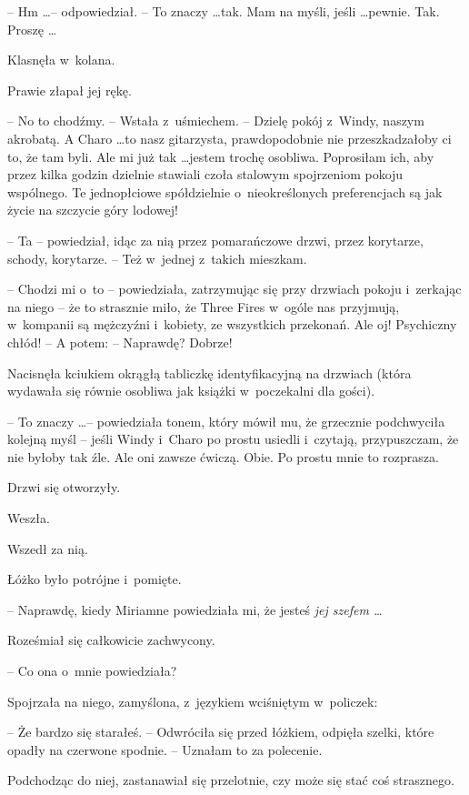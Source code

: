 \documentclass[oneside,polish,11pt,rmheadings]{mwbk}
\begin{document}
-- Hm \ldots  -- odpowiedział. -- To znaczy \ldots  tak. Mam na myśli, jeśli \ldots  pewnie. Tak. Proszę  \ldots  

Klasnęła w~kolana. 

Prawie złapał jej rękę. 

-- No to chodźmy. -- Wstała z~uśmiechem. -- Dzielę pokój z~Windy, naszym akrobatą. A Charo \ldots  to nasz gitarzysta,  prawdopodobnie nie przeszkadzałoby ci to, że tam byli. Ale mi już tak \ldots  jestem trochę osobliwa. Poprosiłam ich, aby przez kilka godzin dzielnie stawiali czoła stalowym spojrzeniom pokoju wspólnego. Te jednopłciowe spółdzielnie o~nieokreślonych preferencjach są jak życie na szczycie góry lodowej! 

-- Ta -- powiedział, idąc za nią przez pomarańczowe drzwi, przez korytarze, schody, korytarze. -- Też w~jednej z~takich mieszkam. 

-- Chodzi mi o~to -- powiedziała, zatrzymując się przy drzwiach pokoju i~zerkając na niego -- że to strasznie miło, że Three Fires w~ogóle nas przyjmują, w~kompanii są mężczyźni i~kobiety, ze wszystkich przekonań. Ale oj! Psychiczny chłód! -- A potem: -- Naprawdę? Dobrze! 

Nacisnęła kciukiem okrągłą tabliczkę  identyfikacyjną na drzwiach (która wydawała się równie osobliwa jak książki w~poczekalni dla gości). 

-- To znaczy \ldots  -- powiedziała tonem, który mówił mu, że grzecznie podchwyciła kolejną myśl -- jeśli Windy i~Charo po prostu usiedli i~czytają, przypuszczam, że nie byłoby tak źle. Ale oni zawsze ćwiczą. Obie. Po prostu mnie to rozprasza. 

Drzwi się otworzyły. 

Weszła. 

Wszedł za nią. 

Łóżko było potrójne i~pomięte. 

-- Naprawdę, kiedy Miriamne powiedziała mi, że jesteś \textit{ jej szefem \ldots } 

Roześmiał się całkowicie zachwycony. 

-- Co ona o~mnie powiedziała? 

Spojrzała na niego, zamyślona, z~językiem wciśniętym w~policzek:  

-- Że bardzo się starałeś. -- Odwróciła się przed łóżkiem, odpięła szelki, które opadły na czerwone spodnie. -- Uznałam to za polecenie.  

Podchodząc do niej, zastanawiał się przelotnie, czy może się stać coś strasznego. 
\end{document}
